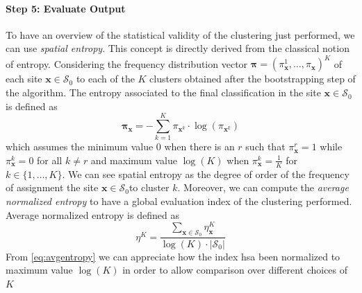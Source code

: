 \paragraph{Step 5: Evaluate Output} To have an overview of the statistical validity of the clustering just performed, we can use \textit{spatial entropy}. This concept is directly derived from the classical notion of entropy. Considering the frequency distribution vector $\boldsymbol{\pi}=(\pi_{\mathbf{x}}^1,\dots,\pi_{\mathbf{x}})^K$ of each site $\mathbf{x} \in \mathcal{S}_0$ to each of the $K$ clusters obtained after the bootstrapping step of the algorithm. The entropy associated to the final classification in the site $\mathbf{x}\in\mathcal{S}_0$ is defined as
\begin{equation}
\mathbf{\pi}_{\mathbf{x}}=-\sum_{k=1}^K\pi_{\mathbf{x}^k}\cdot \log(\pi_{\mathbf{x}^k})
\end{equation}
which assumes the minimum value 0 when there is an $r$ such that $\pi_{\mathbf{x}}^r=1$ while $\pi_{\mathbf{x}}^k=0$ for all $k\neq r$ and maximum value $\log(K)$ when $\pi_{\mathbf{x}}^k=\frac{1}{K}$ for $k\in\{1,\dots,K\}$. We can see spatial entropy as the degree of order of the frequency of assignment the site $\mathbf{x}\in\mathcal{S}_0$to cluster $k$. Moreover, we can compute the \textit{average normalized entropy} to have a global evaluation index of the clustering performed. Average normalized entropy is defined as
\begin{equation}
\label{eq:avgentropy}
    \eta^K=\frac{\sum_{\textbf{x}\in\mathcal{S}_0}\eta_{\mathbf{x}}^K}{\log(K)\cdot |\mathcal{S}_0|}
\end{equation}
From \ref{eq:avgentropy} we can appreciate how the index hsa been normalized to maximum value $\log(K)$ in order to allow comparison over different choices of $K$

